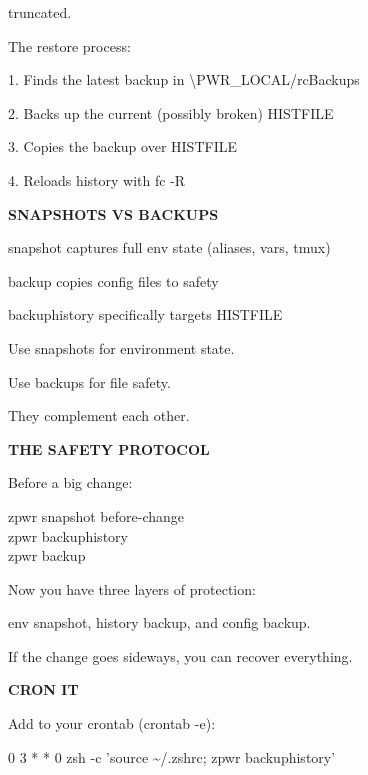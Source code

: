 \documentclass[11pt,a4paper,twoside]{book}
\begin{document}
truncated.

The restore process:

1. Finds the latest backup in \textbackslash{}PWR\_LOCAL/rcBackups

2. Backs up the current (possibly broken) HISTFILE

3. Copies the backup over HISTFILE

4. Reloads history with fc -R


\vspace{12pt}
{\bfseries\color{neonyellow} SNAPSHOTS VS BACKUPS}\vspace{4pt}

\begin{codebox}
snapshot          captures full env state (aliases, vars, tmux)\\
\end{codebox}

backup            copies config files to safety

backuphistory     specifically targets HISTFILE

Use snapshots for environment state.

Use backups for file safety.

They complement each other.


\vspace{12pt}
{\bfseries\color{neonyellow} THE SAFETY PROTOCOL}\vspace{4pt}

Before a big change:

\begin{codebox}
zpwr snapshot before-change\\
zpwr backuphistory\\
zpwr backup\\
\end{codebox}

Now you have three layers of protection:

env snapshot, history backup, and config backup.

If the change goes sideways, you can recover everything.


\vspace{12pt}
{\bfseries\color{neonyellow} CRON IT}\vspace{4pt}

Add to your crontab (crontab -e):

\begin{codebox}
0 3 * * 0 zsh -c 'source \textasciitilde{}/.zshrc; zpwr backuphistory'\\
\end{codebox}
\end{document}
